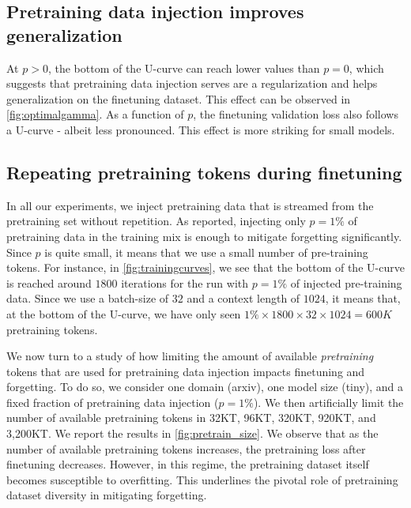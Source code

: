 \subsection{Pretraining data injection improves generalization}

At $p>0$, the bottom of the U-curve can reach lower values than $p=0$, which suggests that pretraining data injection serves are a regularization and helps generalization on the finetuning dataset. 
This effect can be observed in \autoref{fig:optimalgamma}. As a function of $p$, the finetuning validation loss also follows a U-curve - albeit less pronounced. This effect is more striking for small models.

\subsection{Repeating pretraining tokens during finetuning}

In all our experiments, we inject pretraining data that is streamed from the pretraining set without repetition.
As reported, injecting only $p=1\%$ of pretraining data in the training mix is enough to mitigate forgetting significantly. 
Since $p$ is quite small, it means that we use a small number of pre-training tokens. 
For instance, in \autoref{fig:trainingcurves}, we see that the bottom of the U-curve is reached around $1800$ iterations for the run with $p=1\%$ of injected pre-training data.
Since we use a batch-size of $32$ and a context length of $1024$, it means that, at the bottom of the U-curve, we have only seen $1\%\times 1800 \times 32\times 1024=600K$ pretraining tokens.


   
We now turn to a study of how limiting the amount of available \emph{pretraining} tokens that are used for pretraining data injection impacts finetuning and forgetting.
To do so, we consider one domain (arxiv), one model size (tiny), and a fixed fraction of pretraining data injection ($p=1\%$). 
We then artificially limit the number of available pretraining tokens in 32KT, 96KT, 320KT, 920KT, and 3,200KT. %
We report the results in \autoref{fig:pretrain_size}.
We observe that as the number of available pretraining tokens increases, the pretraining loss after finetuning decreases. However, in this regime, the pretraining dataset itself becomes susceptible to overfitting. This underlines the pivotal role of pretraining dataset diversity in mitigating forgetting.  

